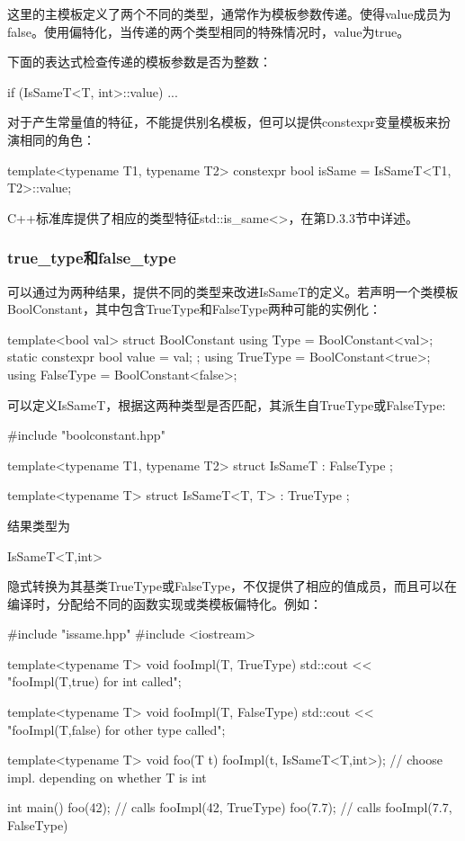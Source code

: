 这里的主模板定义了两个不同的类型，通常作为模板参数传递。使得value成员为false。使用偏特化，当传递的两个类型相同的特殊情况时，value为true。

下面的表达式检查传递的模板参数是否为整数：

\begin{cpp}
if (IsSameT<T, int>::value) ...
\end{cpp}

对于产生常量值的特征，不能提供别名模板，但可以提供constexpr变量模板来扮演相同的角色：

\begin{cpp}
template<typename T1, typename T2>
constexpr bool isSame = IsSameT<T1, T2>::value;
\end{cpp}

C++标准库提供了相应的类型特征std::is\_same<>，在第D.3.3节中详述。

\subsubsection{true\_type和false\_type}

可以通过为两种结果，提供不同的类型来改进IsSameT的定义。若声明一个类模板BoolConstant，其中包含TrueType和FalseType两种可能的实例化：

\begin{cpp}
template<bool val>
struct BoolConstant {
	using Type = BoolConstant<val>;
	static constexpr bool value = val;
};
using TrueType = BoolConstant<true>;
using FalseType = BoolConstant<false>;
\end{cpp}

可以定义IsSameT，根据这两种类型是否匹配，其派生自TrueType或FalseType:

\begin{cpp}
#include "boolconstant.hpp"

template<typename T1, typename T2>
struct IsSameT : FalseType
{};

template<typename T>
struct IsSameT<T, T> : TrueType
{};
\end{cpp}

结果类型为

\begin{cpp}
IsSameT<T,int>
\end{cpp}

隐式转换为其基类TrueType或FalseType，不仅提供了相应的值成员，而且可以在编译时，分配给不同的函数实现或类模板偏特化。例如：

\begin{cpp}
#include "issame.hpp"
#include <iostream>

template<typename T>
void fooImpl(T, TrueType) {
	std::cout << "fooImpl(T,true) for int called\n";
}

template<typename T>
void fooImpl(T, FalseType) {
	std::cout << "fooImpl(T,false) for other type called\n";
}

template<typename T>
void foo(T t) {
	fooImpl(t, IsSameT<T,int>{}); // choose impl. depending on whether T is int
}

int main() {
	foo(42); // calls fooImpl(42, TrueType)
	foo(7.7); // calls fooImpl(7.7, FalseType)
}
\end{cpp}

